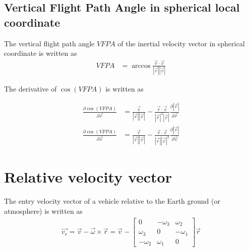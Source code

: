 \documentclass[11pt]{article}
\begin{document}
\subsection{Vertical Flight Path Angle in spherical local coordinate}
The vertical flight path angle $VFPA$ of the inertial velocity vector in spherical coordinate is written as
\begin{equation}
	\label{eq:velocity_VFPA}
	\begin{aligned}
		VFPA &=\arccos{\frac{\vec{r}\cdot\vec{v}}{|\vec{r}||\vec{v}|}}
	\end{aligned}
\end{equation}

\noindent The derivative of $\cos{\left(VFPA\right)}$ is written as

\begin{equation}
	\label{eq:velocity_VFPA_deriv}
	\begin{aligned}
		\frac{\partial \cos{\left(VFPA\right)}}{\partial \vec{r}} &=
		\frac{\vec{v}}{|\vec{r}||\vec{v}|} - \frac{\vec{r}\cdot\vec{v}}{|\vec{r}|^2|\vec{v}|}
		\frac{\partial |\vec{r}|}{\partial \vec{r}}\\
		\frac{\partial \cos{\left(VFPA\right)}}{\partial \vec{v}} &=
		\frac{\vec{r}}{|\vec{r}||\vec{v}|} - \frac{\vec{r}\cdot\vec{v}}{|\vec{r}||\vec{v}|^2}
		\frac{\partial |\vec{v}|}{\partial \vec{v}}
	\end{aligned}
\end{equation}

\section{Relative velocity vector}
The entry velocity vector of a vehicle relative to the Earth ground (or atmosphere) is written as
\begin{equation}
	\label{eq:rel_velocity}
	\begin{aligned}
		\vec{v_r} = \vec{v} - \vec{\omega} \times \vec{r} = \vec{v} -
		\begin{bmatrix}
		0 & -\omega_3 & \omega_2 \\
		\omega_3 & 0 & -\omega_1 \\
		-\omega_2 & \omega_1 & 0
		\end{bmatrix}
		\vec{r}
	\end{aligned}
\end{equation}
\end{document}
